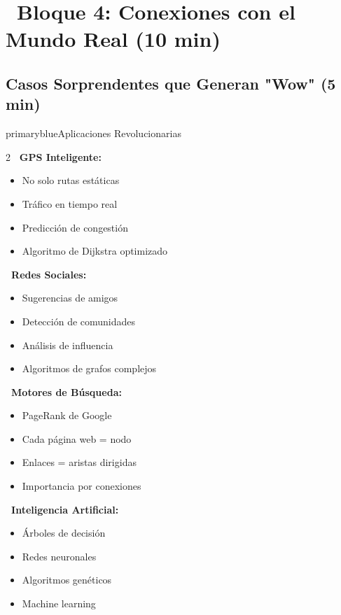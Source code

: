 \documentclass[12pt,a4paper]{article}
\begin{document}
	\newpage
	
	\section*{\faRocket\ Bloque 4: Conexiones con el Mundo Real (10 min)}
	
	
	\subsection*{Casos Sorprendentes que Generan "Wow" (5 min)}
	
	\begin{presentationbox}{primaryblue}{Aplicaciones Revolucionarias}
		\begin{multicols}{2}
			\textbf{\faRoute\ GPS Inteligente:}
			\begin{itemize}
				\item No solo rutas estáticas
				\item Tráfico en tiempo real
				\item Predicción de congestión
				\item Algoritmo de Dijkstra optimizado
			\end{itemize}
			
			\textbf{\faShare\ Redes Sociales:}
			\begin{itemize}
				\item Sugerencias de amigos
				\item Detección de comunidades
				\item Análisis de influencia
				\item Algoritmos de grafos complejos
			\end{itemize}
			
			\columnbreak
			
			\textbf{\faSearch\ Motores de Búsqueda:}
			\begin{itemize}
				\item PageRank de Google
				\item Cada página web = nodo
				\item Enlaces = aristas dirigidas
				\item Importancia por conexiones
			\end{itemize}
			
			\textbf{\faRobot\ Inteligencia Artificial:}
			\begin{itemize}
				\item Árboles de decisión
				\item Redes neuronales
				\item Algoritmos genéticos
				\item Machine learning
			\end{itemize}
		\end{multicols}
	\end{presentationbox}
	
\end{document}
